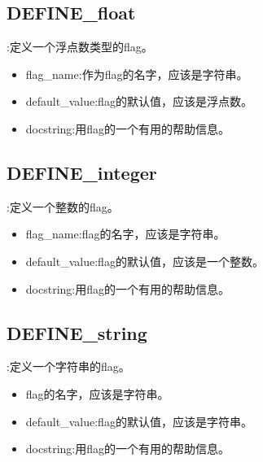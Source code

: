 \subsection{DEFINE\_float}:定义一个浮点数类型的flag。
\begin{itemize}
\item flag\_name:作为flag的名字，应该是字符串。
\item default\_value:flag的默认值，应该是浮点数。
\item docstring:用flag的一个有用的帮助信息。
\end{itemize}
\subsection{DEFINE\_integer}:定义一个整数的flag。
\begin{itemize}
\item flag\_name:flag的名字，应该是字符串。
\item default\_value:flag的默认值，应该是一个整数。
\item docstring:用flag的一个有用的帮助信息。
\end{itemize}
\subsection{DEFINE\_string}:定义一个字符串的flag。
\begin{itemize}
\item flag的名字，应该是字符串。
\item default\_value:flag的默认值，应该是字符串。
\item docstring:用flag的一个有用的帮助信息。
\end{itemize}

